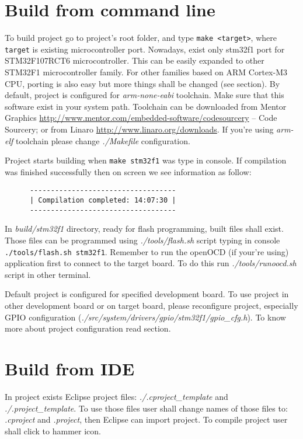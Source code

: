 \documentclass[a4paper,11pt]{report}
\renewcommand{\path}[1]{\textit{#1}}
\newcommand{\cmd}[1]{\texttt{#1}}
\begin{document}
\section{Build from command line}
To build project go to project's root folder, and type \cmd{make <target>}, where \cmd{target} is
existing microcontroller port. Nowadays, exist only stm32f1 port for STM32F107RCT6 microcontroller.
This can be easily expanded to other STM32F1 microcontroller family. For other families based on
ARM Cortex-M3 CPU, porting is also easy but more things shall be changed (see 
section). By default, project is configured for \path{arm-none-eabi} toolchain. Make sure that
this software exist in your system path. Toolchain can be downloaded from Mentor Graphics
\url{http://www.mentor.com/embedded-software/codesourcery} -- Code Sourcery; or from Linaro
\url{http://www.linaro.org/downloads}. If you're using \path{arm-elf} toolchain please change
\path{./Makefile} configuration.

Project starts building when \cmd{make stm32f1} was type in console. If compilation was finished
successfully then on screen we see information as follow:
\begin{verbatim}
      -----------------------------------
      | Compilation completed: 14:07:30 |
      -----------------------------------
\end{verbatim}
In \path{build/stm32f1} directory, ready for flash programming, built files shall exist. Those
files can be programmed using \path{./tools/flash.sh} script typing in console
\cmd{./tools/flash.sh stm32f1}. Remember to run the openOCD (if your're using) application first to
connect to the target board. To do this run \path{./tools/runoocd.sh} script in other terminal.

Default project is configured for specified development board. To use project in other development
board or on target board, please reconfigure project, especially GPIO configuration
(\path{./src/system/drivers/gpio/stm32f1/gpio\_cfg.h}). To know more about project configuration
read  section.

\section{Build from IDE}
In project exists Eclipse project files: \path{./.cproject\_template} and
\path{./.project\_template}. To use those files user shall change names of those files to:
\path{.cproject} and \path{.project}, then Eclipse can import project. To compile project user
shall click to hammer icon.
\end{document}
